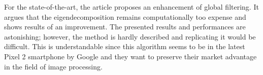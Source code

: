 For the state-of-the-art, the article \cite{talebi_fast_2016} proposes an enhancement of global filtering.
It argues that the eigendecomposition remains computationally too expense and shows results of an improvement.
The presented results and performances are astonishing; however, the method is hardly described and replicating it would be difficult.
This is understandable since this algorithm seems to be in the latest Pixel 2 smartphone by Google and they want to preserve their market advantage in the field of image processing.
